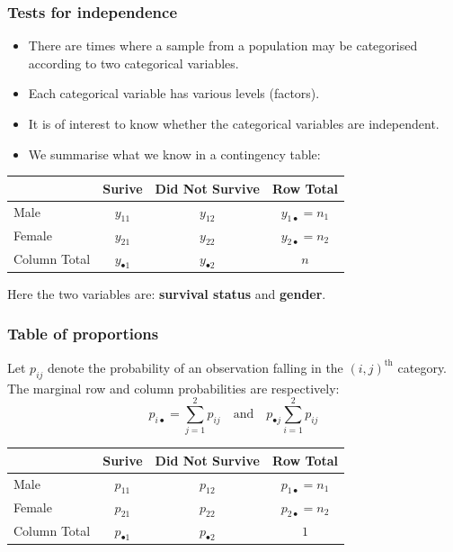 \documentclass[a4paper]{article}
\begin{document}
\subsubsection{Tests for independence}
\begin{itemize}
	\item There are times where a sample from a population may be categorised according to two categorical variables.
	\item Each categorical variable has various levels (factors).
	\item It is of interest to know whether the categorical variables are independent.
	\item We summarise what we know in a contingency table:
\end{itemize}
\begin{table}[H]
	\centering
	\begin{tabular}{@{}lcc|c@{}}
	\toprule
				 & Surive  			   & Did Not Survive 	  & Row Total                 \\ \midrule
	Male   	  	 & \( y_{11} \)		   & \( y_{12} \) 	      & \( y_{1 \bullet} = n_1 \) \\
	Female   	 & \( y_{21} \) 	   & \( y_{22} \) 	      & \( y_{2 \bullet} = n_2 \) \\ \midrule
	Column Total & \( y_{\bullet 1} \) & \( y_{\bullet 2} \)  & \( n \) 				  \\ \bottomrule
	\end{tabular}
\end{table}
Here the two variables are: \textbf{survival status} and \textbf{gender}.
\subsubsection{Table of proportions}
Let \( p_{ij} \) denote the probability of an observation falling in the \( (i,j)^{\text{th}} \) category. The marginal row and column probabilities are respectively:
\[
	p_{i \bullet} = \sum_{j=1}^{2} p_{ij} \quad\text{and}\quad p_{\bullet j} \sum_{i=1}^{2} p_{ij}
\]
\begin{table}[H]
	\centering
	\begin{tabular}{@{}lcc|c@{}}
	\toprule
				 & Surive  			   & Did Not Survive 	  & Row Total                 \\ \midrule
	Male   	  	 & \( p_{11} \)		   & \( p_{12} \) 	      & \( p_{1 \bullet} = n_1 \) \\
	Female   	 & \( p_{21} \) 	   & \( p_{22} \) 	      & \( p_{2 \bullet} = n_2 \) \\ \midrule
	Column Total & \( p_{\bullet 1} \) & \( p_{\bullet 2} \)  & \( 1 \) 				  \\ \bottomrule
	\end{tabular}
\end{table}
\end{document}
